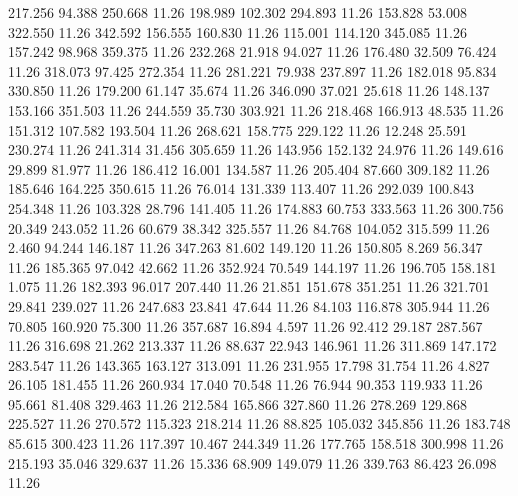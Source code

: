  217.256   94.388  250.668        11.26
 198.989  102.302  294.893        11.26
 153.828   53.008  322.550        11.26
 342.592  156.555  160.830        11.26
 115.001  114.120  345.085        11.26
 157.242   98.968  359.375        11.26
 232.268   21.918   94.027        11.26
 176.480   32.509   76.424        11.26
 318.073   97.425  272.354        11.26
 281.221   79.938  237.897        11.26
 182.018   95.834  330.850        11.26
 179.200   61.147   35.674        11.26
 346.090   37.021   25.618        11.26
 148.137  153.166  351.503        11.26
 244.559   35.730  303.921        11.26
 218.468  166.913   48.535        11.26
 151.312  107.582  193.504        11.26
 268.621  158.775  229.122        11.26
  12.248   25.591  230.274        11.26
 241.314   31.456  305.659        11.26
 143.956  152.132   24.976        11.26
 149.616   29.899   81.977        11.26
 186.412   16.001  134.587        11.26
 205.404   87.660  309.182        11.26
 185.646  164.225  350.615        11.26
  76.014  131.339  113.407        11.26
 292.039  100.843  254.348        11.26
 103.328   28.796  141.405        11.26
 174.883   60.753  333.563        11.26
 300.756   20.349  243.052        11.26
  60.679   38.342  325.557        11.26
  84.768  104.052  315.599        11.26
   2.460   94.244  146.187        11.26
 347.263   81.602  149.120        11.26
 150.805    8.269   56.347        11.26
 185.365   97.042   42.662        11.26
 352.924   70.549  144.197        11.26
 196.705  158.181    1.075        11.26
 182.393   96.017  207.440        11.26
  21.851  151.678  351.251        11.26
 321.701   29.841  239.027        11.26
 247.683   23.841   47.644        11.26
  84.103  116.878  305.944        11.26
  70.805  160.920   75.300        11.26
 357.687   16.894    4.597        11.26
  92.412   29.187  287.567        11.26
 316.698   21.262  213.337        11.26
  88.637   22.943  146.961        11.26
 311.869  147.172  283.547        11.26
 143.365  163.127  313.091        11.26
 231.955   17.798   31.754        11.26
   4.827   26.105  181.455        11.26
 260.934   17.040   70.548        11.26
  76.944   90.353  119.933        11.26
  95.661   81.408  329.463        11.26
 212.584  165.866  327.860        11.26
 278.269  129.868  225.527        11.26
 270.572  115.323  218.214        11.26
  88.825  105.032  345.856        11.26
 183.748   85.615  300.423        11.26
 117.397   10.467  244.349        11.26
 177.765  158.518  300.998        11.26
 215.193   35.046  329.637        11.26
  15.336   68.909  149.079        11.26
 339.763   86.423   26.098        11.26
